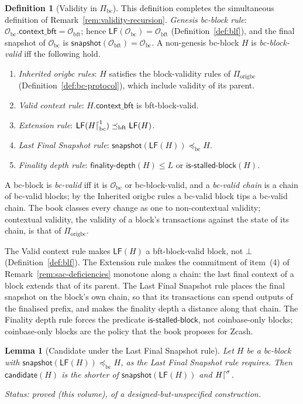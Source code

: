 \documentclass[11pt,a4paper]{article}
\newtheorem{lemma}[theorem]{Lemma}
\theoremstyle{definition}
\newtheorem{definition}[theorem]{Definition}
\newcommand{\bc}{\mathrm{bc}}
\newcommand{\bft}{\mathrm{bft}}
\newcommand{\Origin}{\mathcal{O}}
\newcommand{\Obc}{\Origin_{\bc}}
\newcommand{\Obft}{\Origin_{\bft}}
\newcommand{\preceqbc}{\preceq_{\bc}}
\newcommand{\preceqbft}{\preceq_{\bft}}
\newcommand{\Piorigbc}{\Pi_{\mathrm{origbc}}}
\newcommand{\Pibc}{\Pi_{\bc}}
\newcommand{\isstalledblock}{\mathsf{is\text{-}stalled\text{-}block}}
\newcommand{\contextbft}{\mathsf{context\_bft}}
\newcommand{\snapshot}{\mathsf{snapshot}}
\newcommand{\LF}{\mathsf{LF}}
\newcommand{\candidate}{\mathsf{candidate}}
\newcommand{\finalitydepth}{\mathsf{finality\text{-}depth}}
\begin{document}
\begin{definition}[Validity in $\Pibc$]\label{def:bc-validity}
This definition completes the simultaneous definition of
Remark~\ref{rem:validity-recursion}. \emph{Genesis bc-block rule}:
$\Obc.\contextbft = \Obft$; hence $\LF(\Obc) = \Obft$
(Definition~\ref{def:blf}), and the final snapshot of $\Obc$ is
$\snapshot(\Obft) = \Obc$. A non-genesis bc-block $H$ is
\emph{bc-block-valid} iff the following hold.
\begin{enumerate}[label=(\roman*)]
\item \emph{Inherited origbc rules}: $H$ satisfies the block-validity rules
  of $\Piorigbc$ (Definition~\ref{def:bc-protocol}), which include validity
  of its parent.
\item \emph{Valid context rule}: $H.\contextbft$ is bft-block-valid.
\item \emph{Extension rule}: $\LF(H\trunc[\bc]{1}) \preceqbft \LF(H)$.
\item \emph{Last Final Snapshot rule}: $\snapshot(\LF(H)) \preceqbc H$.
\item \emph{Finality depth rule}: $\finalitydepth(H) \le L$ or
  $\isstalledblock(H)$.
\end{enumerate}
A bc-block is \emph{bc-valid} iff it is $\Obc$ or bc-block-valid, and a
\emph{bc-valid chain} is a chain of bc-valid blocks; by the Inherited origbc
rules a bc-valid block tips a bc-valid chain. The book classes every change
as one to non-contextual validity; contextual validity, the validity of a
block's transactions against the state of its chain, is that of $\Piorigbc$.
\end{definition}

The Valid context rule makes $\LF(H)$ a bft-block-valid block, not $\bot$
(Definition~\ref{def:blf}). The Extension rule makes the commitment of
item~(4) of Remark~\ref{rem:sac-deficiencies} monotone along a chain: the
last final context of a block extends that of its parent. The Last Final
Snapshot rule places the final snapshot on the block's own chain, so that its
transactions can spend outputs of the finalised prefix, and makes the finality
depth a distance along that chain. The Finality depth rule forces the
predicate $\isstalledblock$, not coinbase-only blocks; coinbase-only blocks
are the policy that the book proposes for Zcash.

\begin{lemma}[Candidate under the Last Final Snapshot rule]
\label{lem:candidate-lfs}
Let $H$ be a bc-block with $\snapshot(\LF(H)) \preceqbc H$, as the Last Final
Snapshot rule requires. Then $\candidate(H)$ is the shorter of
$\snapshot(\LF(H))$ and $H\trunc{\sigma}$.

Status: proved (this volume), of a designed-but-unspecified construction.
\end{lemma}
\end{document}
